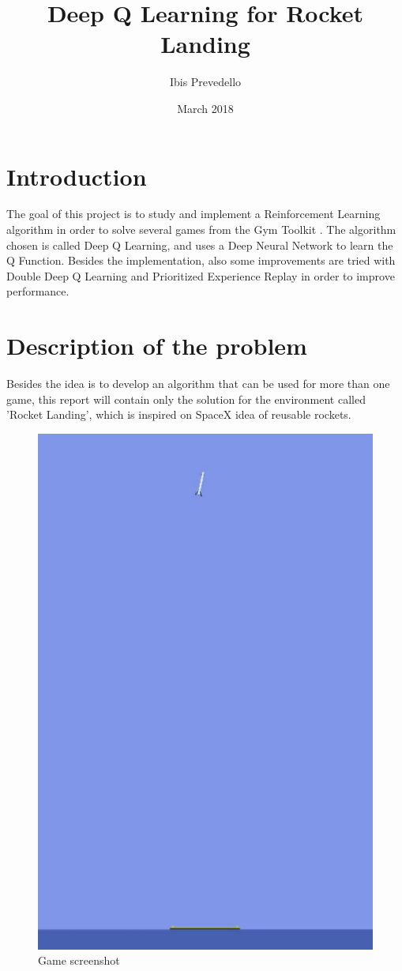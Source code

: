 \documentclass{article}
\title{Deep Q Learning for Rocket Landing}
\date{March 2018}
\author{Ibis Prevedello}
\begin{document}
\maketitle

\section{Introduction}
The goal of this project is to study and implement a Reinforcement Learning algorithm in order to solve several games from the Gym Toolkit \cite{gym}. The algorithm chosen is called Deep Q Learning, and uses a Deep Neural Network to learn the Q Function. Besides the implementation, also some improvements are tried with Double Deep Q Learning and Prioritized Experience Replay in order to improve performance.

\section{Description of the problem}
Besides the idea is to develop an algorithm that can be used for more than one game, this report will contain only the solution for the environment called 'Rocket Landing', which is inspired on SpaceX idea of reusable rockets.

\begin{figure}[h]
\centering
\includegraphics[scale=0.30]{environment}
\caption{Game screenshot}
\label{fig:fig1}
\end{figure}
\end{document}
